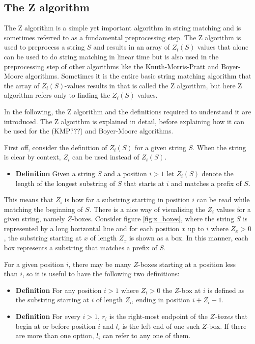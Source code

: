 \subsection{The Z algorithm}
The Z algorithm is a simple yet important algorithm in string matching and is sometimes referred to as a fundamental preprocessing step.\cite{Gusfield1997AlgorithmsOS} The Z algorithm is used to preprocess a string $S$ and results in an array of $Z_i(S)$ values that alone can be used to do string matching in linear time but is also used in the preprocessing step of other algorithms like the Knuth-Morris-Pratt and Boyer-Moore algorithms. Sometimes it is the entire basic string matching algorithm that the array of $Z_i(S)$-values results in that is called the Z algorithm, but here Z algorithm refers only to finding the $Z_i(S)$ values. 

In the following, the Z algorithm and the definitions required to understand it are introduced. The Z algorithm is explained in detail, before explaining how it can be used for the (KMP???) and Boyer-Moore algorithms. 

First off, consider the definition of $Z_i(S)$ for a given string $S$. When the string is clear by context, $Z_i$ can be used instead of $Z_i(S)$. 

\begin{itemize}
    \item[] \textbf{Definition} Given a string $S$ and a position $i>1$ let $Z_i(S)$ denote the length of the longest substring of $S$ that starts at $i$ and matches a prefix of $S$. 
\end{itemize}

This means that $Z_i$ is how far a substring starting in position $i$ can be read while matching the beginning of $S$. There is a nice way of visualising the $Z_i$ values for a given string, namely $Z$-boxes. Consider figure \ref{fig:z_boxes}, where the string $S$ is represented by a long horizontal line and for each position $x$ up to $i$ where $Z_x>0$, the substring starting at $x$ of length $Z_x$ is shown as a box. In this manner, each box represents a substring that matches a prefix of $S$. 

For a given position $i$, there may be many $Z$-boxes starting at a position less than $i$, so it is useful to have the following two definitions:

\begin{itemize}
    \item[] \textbf{Definition} For any position $i>1$ where $Z_i>0$ the $Z$-box at $i$ is defined as the substring starting at $i$ of length $Z_i$, ending in position $i+Z_i-1$. 
    \item[] \textbf{Definition} For every $i>1$, $r_i$ is the right-most endpoint of the \textit{$Z$-boxes} that begin at or before position $i$ and $l_i$ is the left end of one such $Z$-box. If there are more than one option, $l_i$ can refer to any one of them. 
\end{itemize}

